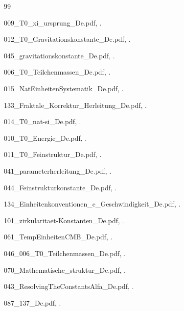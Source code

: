 	\begin{thebibliography}{99}
		
		009\_T0\_xi\_ursprung\_De.pdf, .
		
		012\_T0\_Gravitationskonstante\_De.pdf, .
		
		045\_gravitationskonstante\_De.pdf, .
		
		006\_T0\_Teilchenmassen\_De.pdf, .
		
		015\_NatEinheitenSystematik\_De.pdf, .
		
		133\_Fraktale\_Korrektur\_Herleitung\_De.pdf, .
		
		014\_T0\_nat-si\_De.pdf, .
		
		010\_T0\_Energie\_De.pdf, .
		
		011\_T0\_Feinstruktur\_De.pdf, .
		
		041\_parameterherleitung\_De.pdf, .
		
		044\_Feinstrukturkonstante\_De.pdf, .
		
		134\_Einheitenkonventionen\_c\_Geschwindigkeit\_De.pdf, .
		
		101\_zirkularitaet-Konstanten\_De.pdf, .
		
		061\_TempEinheitenCMB\_De.pdf, .
		
		046\_006\_T0\_Teilchenmassen\_De.pdf, .
		
		070\_Mathematische\_struktur\_De.pdf, .
		
		043\_ResolvingTheConstantsAlfa\_De.pdf, .
		
		087\_137\_De.pdf, .
		
	\end{thebibliography}
	